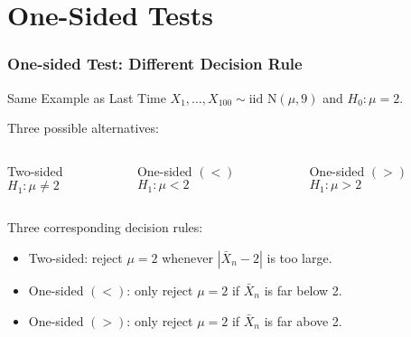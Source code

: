 \section{One-Sided Tests}
\begin{frame}
  \frametitle{One-sided Test: Different Decision Rule} 

  \begin{block}{Same Example as Last Time}
  $X_1, \dots, X_{100}\sim \mbox{iid N}(\mu, 9)$ and $H_0\colon \mu=2$. 
\end{block}

\begin{alertblock}{Three possible alternatives:}

  \begin{columns}
    \begin{block}{Two-sided}
      $H_1\colon \mu \neq 2$
    \end{block}
    \begin{block}{One-sided $(<)$}
      $H_1\colon \mu < 2$
    \end{block}
    \begin{block}{One-sided $(>)$}
      $H_1\colon \mu > 2$
    \end{block}
  \end{columns}
\end{alertblock}

\vspace{1em}

\begin{block}{Three corresponding decision rules:}
  \begin{itemize}
    \item Two-sided: reject $\mu = 2$ whenever $|\bar{X}_n - 2|$ is too large.
    \item One-sided $(<)$: only reject $\mu = 2$ if $\bar{X}_n$ is far \alert{below} 2.
    \item One-sided $(>)$: only reject $\mu = 2$ if $\bar{X}_n$ is far \alert{above} 2.
  \end{itemize}
\end{block}
\end{frame}
